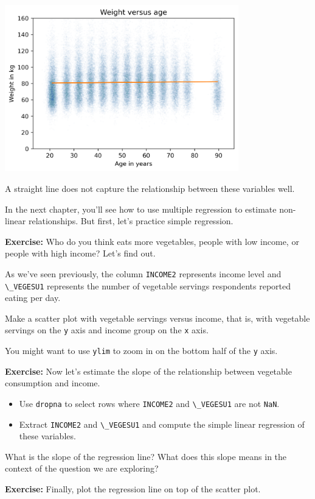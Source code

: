\begin{center}
\includegraphics[width=4in]{chapters/09_relationships_files/09_relationships_107_0.png}
\end{center}

A straight line does not capture the relationship between these
variables well.

In the next chapter, you'll see how to use multiple regression to
estimate non-linear relationships. But first, let's practice simple
regression.

\textbf{Exercise:} Who do you think eats more vegetables, people with
low income, or people with high income? Let's find out.

As we've seen previously, the column \passthrough{\lstinline!INCOME2!}
represents income level and \passthrough{\lstinline!\_VEGESU1!}
represents the number of vegetable servings respondents reported eating
per day.

Make a scatter plot with vegetable servings versus income, that is, with
vegetable servings on the \passthrough{\lstinline!y!} axis and income
group on the \passthrough{\lstinline!x!} axis.

You might want to use \passthrough{\lstinline!ylim!} to zoom in on the
bottom half of the \passthrough{\lstinline!y!} axis.

\textbf{Exercise:} Now let's estimate the slope of the relationship
between vegetable consumption and income.

\begin{itemize}
\item
  Use \passthrough{\lstinline!dropna!} to select rows where
  \passthrough{\lstinline!INCOME2!} and
  \passthrough{\lstinline!\_VEGESU1!} are not
  \passthrough{\lstinline!NaN!}.
\item
  Extract \passthrough{\lstinline!INCOME2!} and
  \passthrough{\lstinline!\_VEGESU1!} and compute the simple linear
  regression of these variables.
\end{itemize}

What is the slope of the regression line? What does this slope means in
the context of the question we are exploring?

\textbf{Exercise:} Finally, plot the regression line on top of the
scatter plot.

